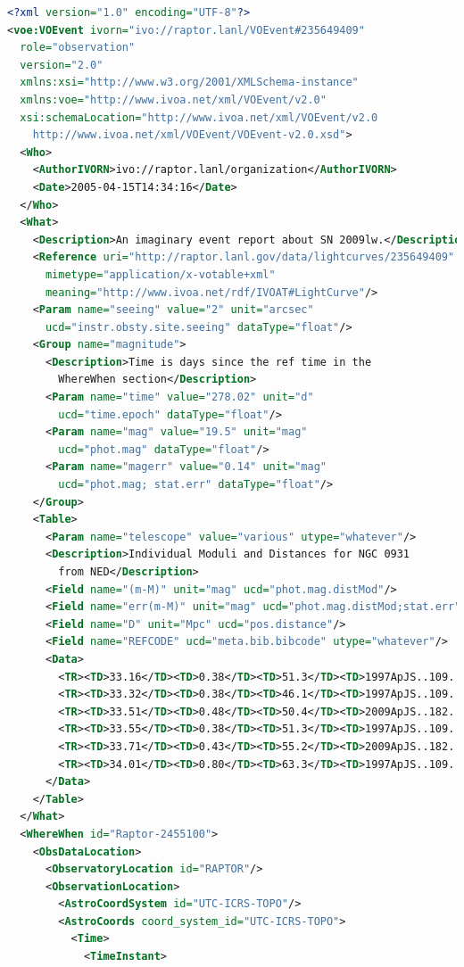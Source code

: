\documentclass[11pt,a4paper]{ivoa}
\begin{document}
\begin{lstlisting}[language=XML]
<?xml version="1.0" encoding="UTF-8"?>
<voe:VOEvent ivorn="ivo://raptor.lanl/VOEvent#235649409" 
  role="observation" 
  version="2.0"
  xmlns:xsi="http://www.w3.org/2001/XMLSchema-instance"
  xmlns:voe="http://www.ivoa.net/xml/VOEvent/v2.0"
  xsi:schemaLocation="http://www.ivoa.net/xml/VOEvent/v2.0     
    http://www.ivoa.net/xml/VOEvent/VOEvent-v2.0.xsd">
  <Who>
    <AuthorIVORN>ivo://raptor.lanl/organization</AuthorIVORN>
    <Date>2005-04-15T14:34:16</Date>
  </Who>
  <What>
    <Description>An imaginary event report about SN 2009lw.</Description>
    <Reference uri="http://raptor.lanl.gov/data/lightcurves/235649409"
      mimetype="application/x-votable+xml" 
      meaning="http://www.ivoa.net/rdf/IVOAT#LightCurve"/>
    <Param name="seeing" value="2" unit="arcsec" 
      ucd="instr.obsty.site.seeing" dataType="float"/>
    <Group name="magnitude">
      <Description>Time is days since the ref time in the 
        WhereWhen section</Description>
      <Param name="time" value="278.02" unit="d" 
        ucd="time.epoch" dataType="float"/>
      <Param name="mag" value="19.5" unit="mag" 
        ucd="phot.mag" dataType="float"/>
      <Param name="magerr" value="0.14" unit="mag" 
        ucd="phot.mag; stat.err" dataType="float"/>
    </Group>
    <Table>
      <Param name="telescope" value="various" utype="whatever"/>
      <Description>Individual Moduli and Distances for NGC 0931 
        from NED</Description>
      <Field name="(m-M)" unit="mag" ucd="phot.mag.distMod"/>
      <Field name="err(m-M)" unit="mag" ucd="phot.mag.distMod;stat.err"/>
      <Field name="D" unit="Mpc" ucd="pos.distance"/>
      <Field name="REFCODE" ucd="meta.bib.bibcode" utype="whatever"/>
      <Data>
        <TR><TD>33.16</TD><TD>0.38</TD><TD>51.3</TD><TD>1997ApJS..109..333W</TD></TR>
        <TR><TD>33.32</TD><TD>0.38</TD><TD>46.1</TD><TD>1997ApJS..109..333W</TD></TR>
        <TR><TD>33.51</TD><TD>0.48</TD><TD>50.4</TD><TD>2009ApJS..182..474S</TD></TR>
        <TR><TD>33.55</TD><TD>0.38</TD><TD>51.3</TD><TD>1997ApJS..109..333W</TD></TR>
        <TR><TD>33.71</TD><TD>0.43</TD><TD>55.2</TD><TD>2009ApJS..182..474S</TD></TR>
        <TR><TD>34.01</TD><TD>0.80</TD><TD>63.3</TD><TD>1997ApJS..109..333W</TD></TR>
      </Data>
    </Table>
  </What>
  <WhereWhen id="Raptor-2455100">
    <ObsDataLocation>
      <ObservatoryLocation id="RAPTOR"/>
      <ObservationLocation>
        <AstroCoordSystem id="UTC-ICRS-TOPO"/>
        <AstroCoords coord_system_id="UTC-ICRS-TOPO">
          <Time>
            <TimeInstant>

\end{lstlisting}
\end{document}
